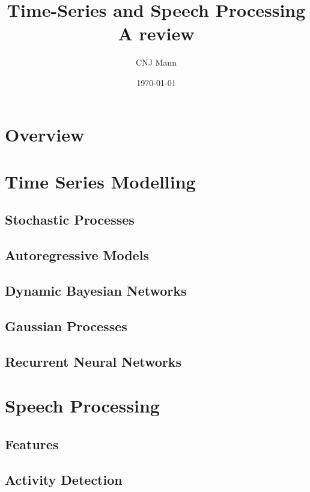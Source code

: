 \documentclass[12pt]{article}
\begin{document}
\title{Time-Series and Speech Processing\\ \small{A review}}
\author{CNJ Mann}
\date{\today}
\maketitle

\tableofcontents
\pagebreak

\section{Overview}

\section{Time Series Modelling}

\subsection{Stochastic Processes}

\subsection{Autoregressive Models}

\subsection{Dynamic Bayesian Networks}

\subsection{Gaussian Processes}

\subsection{Recurrent Neural Networks}

\section{Speech Processing}

\subsection{Features}

\subsection{Activity Detection}
\end{document}
